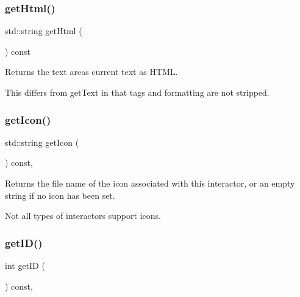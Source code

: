 \subsubsection{\texorpdfstring{get\+Html()}{getHtml()}}
{\footnotesize\ttfamily std\+::string get\+Html (\begin{DoxyParamCaption}{ }\end{DoxyParamCaption}) const\hspace{0.3cm}{\ttfamily [virtual]}}



Returns the text area\textquotesingle{}s current text as H\+T\+ML. 

This differs from get\+Text in that tags and formatting are not stripped. \mbox{\label{classsgl_1_1GInteractor_aaed62a73004939a64da6f0eb9eb64d73}} 
\subsubsection{\texorpdfstring{get\+Icon()}{getIcon()}}
{\footnotesize\ttfamily std\+::string get\+Icon (\begin{DoxyParamCaption}{ }\end{DoxyParamCaption}) const\hspace{0.3cm}{\ttfamily [virtual]}, {\ttfamily [inherited]}}



Returns the file name of the icon associated with this interactor, or an empty string if no icon has been set. 

Not all types of interactors support icons. \mbox{\label{classsgl_1_1GInteractor_a9c9659a6c6ba66b4107ba59c95a24241}} 
\subsubsection{\texorpdfstring{get\+I\+D()}{getID()}}
{\footnotesize\ttfamily int get\+ID (\begin{DoxyParamCaption}{ }\end{DoxyParamCaption}) const\hspace{0.3cm}{\ttfamily [virtual]}, {\ttfamily [inherited]}}



